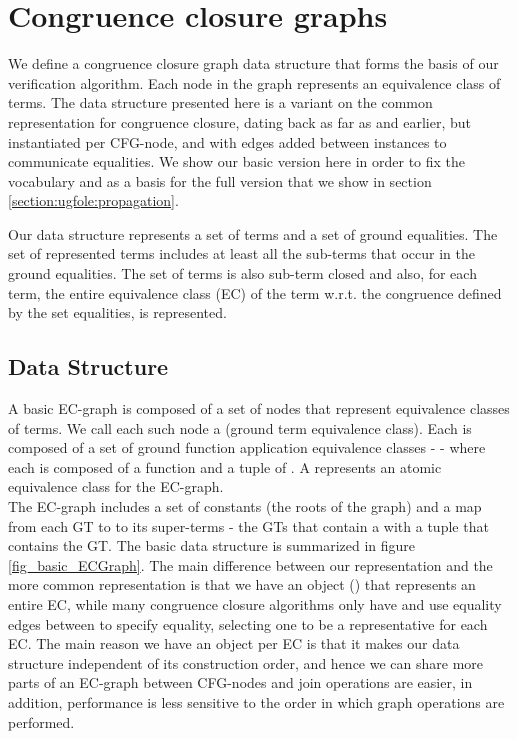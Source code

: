 \section{Congruence closure graphs}
We define a congruence closure graph data structure that forms the basis of our verification algorithm. Each node in the graph represents an equivalence class of terms.
The data structure presented here is a variant on the common representation for congruence closure, dating back as far as \cite{DowneySethiTarjan} and earlier, but instantiated per CFG-node, and with edges added between instances to communicate equalities. We show our basic version here in order to fix the vocabulary and as a basis for the full version that we show in section \ref{section:ugfole:propagation}.

Our data structure represents a set of terms and a set of ground equalities.
The set of represented terms includes at least all the sub-terms that occur in the ground equalities.
The set of terms is also sub-term closed and also, for each term, the entire equivalence class (EC) of the term w.r.t. the congruence defined by the set equalities, is represented.

\subsection{Data Structure}
A basic EC-graph is composed of a set of nodes that represent equivalence classes of terms. We call each such node a \newdef{\GT{}} (ground term equivalence class). Each \GT{} is composed of a set of ground function application equivalence classes - \newdef{\GFAs} - where each \GFA{} is composed of a function and a tuple of \GTs{}. A \GFA{} represents an atomic equivalence class for the EC-graph.\\
The EC-graph includes a set of constants (the roots of the graph) and a map from each GT to to its super-terms - the GTs that contain a \GFA{} with a tuple that contains the GT. The basic data structure is summarized in figure \ref{fig_basic_ECGraph}.
The main difference between our representation and the more common representation is that we have an object (\GT{}) that represents an entire EC, while many congruence closure algorithms only have \GFAs{} and use equality edges between \GFAs{} to specify equality, selecting one \GFA{} to be a representative for each EC. 
The main reason we have an object per EC is that it makes our data structure independent of its construction order, 
and hence we can share more parts of an EC-graph between CFG-nodes and join operations are easier, in addition, performance is less sensitive to the order in which graph operations are performed.

